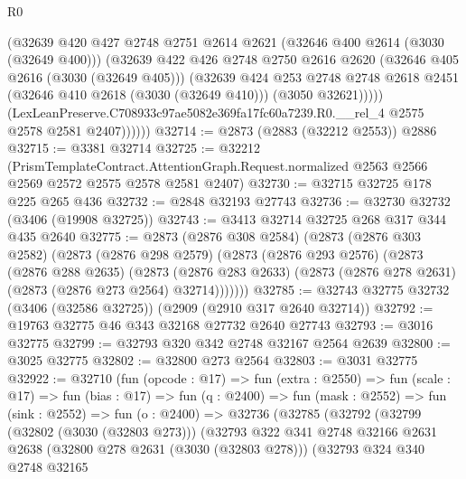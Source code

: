 \begin{lexlean}{R0}
\begin{coremodule}
                (@32639
                  @420
                  @427
                  @2748
                  @2751
                  @2614
                  @2621
                  (@32646 @400 @2614 (@3030 (@32649 @400)))
                  (@32639
                    @422
                    @426
                    @2748
                    @2750
                    @2616
                    @2620
                    (@32646 @405 @2616 (@3030 (@32649 @405)))
                    (@32639
                      @424
                      @253
                      @2748
                      @2748
                      @2618
                      @2451
                      (@32646 @410 @2618 (@3030 (@32649 @410)))
                      (@3050 @32621)))))
              (LexLeanPreserve.C708933c97ae5082e369fa17fc60a7239.R0.__rel_4
                @2575
                @2578
                @2581
                @2407))))))
@32714 := @2873 (@2883 (@32212 @2553)) @2886
@32715 := @3381 @32714
@32725 := @32212
    (PrismTemplateContract.AttentionGraph.Request.normalized
      @2563
      @2566
      @2569
      @2572
      @2575
      @2578
      @2581
      @2407)
@32730 := @32715 @32725 @178 @225 @265 @436
@32732 := @2848 @32193 @27743
@32736 := @32730 @32732 (@3406 (@19908 @32725))
@32743 := @3413 @32714 @32725 @268 @317 @344 @435 @2640
@32775 := @2873
    (@2876 @308 @2584)
    (@2873
      (@2876 @303 @2582)
      (@2873
        (@2876 @298 @2579)
        (@2873
          (@2876 @293 @2576)
          (@2873
            (@2876 @288 @2635)
            (@2873
              (@2876 @283 @2633)
              (@2873 (@2876 @278 @2631) (@2873 (@2876 @273 @2564) @32714)))))))
@32785 := @32743 @32775 @32732 (@3406 (@32586 @32725)) (@2909 (@2910 @317 @2640 @32714))
@32792 := @19763 @32775 @46 @343 @32168 @27732 @2640 @27743
@32793 := @3016 @32775
@32799 := @32793 @320 @342 @2748 @32167 @2564 @2639
@32800 := @3025 @32775
@32802 := @32800 @273 @2564
@32803 := @3031 @32775
@32922 := @32710
    (fun (opcode : @17) =>
    fun (extra : @2550) =>
    fun (scale : @17) =>
    fun (bias : @17) =>
    fun (q : @2400) =>
    fun (mask : @2552) =>
    fun (sink : @2552) =>
    fun (o : @2400) =>
    @32736
      (@32785
        (@32792
          (@32799
            (@32802 (@3030 (@32803 @273)))
            (@32793
              @322
              @341
              @2748
              @32166
              @2631
              @2638
              (@32800 @278 @2631 (@3030 (@32803 @278)))
              (@32793
                @324
                @340
                @2748
                @32165

\end{coremodule}
\end{lexlean}
